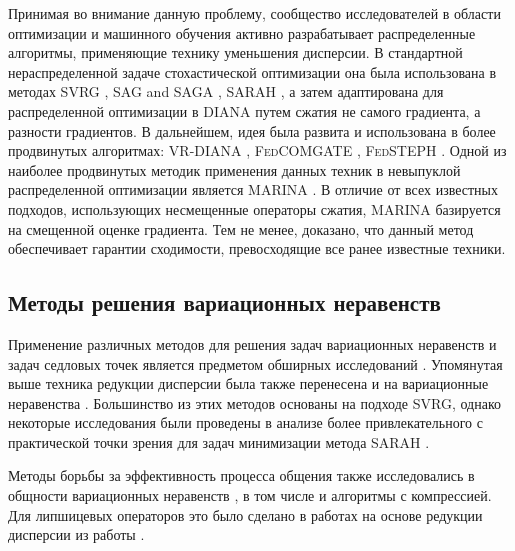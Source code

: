 \documentclass{ProcISPRAS}
\begin{document}
Принимая во внимание данную проблему, сообщество исследователей в области оптимизации и машинного обучения активно разрабатывает распределенные алгоритмы, применяющие технику уменьшения дисперсии. В стандартной нераспределенной задаче стохастической оптимизации она была использована в методах \textsc{SVRG} \cite{johnson2013accelerating}, \textsc{SAG} \cite{roux2012stochastic} and \textsc{SAGA} \cite{defazio2014saga}, \textsc{SARAH} \cite{nguyen2017sarah, beznosikov2024random}, а затем адаптирована для распределенной оптимизации в \textsc{DIANA} \cite{mishchenko2024distributed} путем сжатия не самого градиента, а разности градиентов. В дальнейшем, идея была развита и использована в более продвинутых алгоритмах: \textsc{VR-DIANA} \cite{horvoth2022natural}, \textsc{FedCOMGATE} \cite{haddadpour2021federated}, \textsc{FedSTEPH} \cite{das2022faster}.
Одной из наиболее продвинутых методик применения данных техник в невыпуклой распределенной оптимизации является \textsc{MARINA} \cite{gorbunov2021marina}. В отличие от всех известных подходов, использующих несмещенные операторы сжатия, \textsc{MARINA} базируется на смещенной оценке градиента. Тем не менее, доказано, что данный метод обеспечивает гарантии сходимости, превосходящие все ранее известные техники.

\subsection{Методы решения вариационных неравенств}
Применение различных методов для решения задач вариационных неравенств и задач седловых точек является предметом обширных исследований \cite{juditsky2011solving, gidel2018variational, hsieh2019convergence, mishchenko2020revisiting, hsieh2020explore, gorbunov2022stochastic, beznosikov2023smooth, beznosikov2024first, solodkin2024methods}. Упомянутая выше техника редукции дисперсии была также перенесена и на вариационные неравенства \cite{palaniappan2016stochastic,chavdarova2019reducing,Yura2021,alacaoglu2021stochastic, kovalev2022optimalvi, beznosikov2022unified, pichugin2023optimal, pichugin2024method, medyakovshuffling}. Большинство из этих методов основаны на подходе \textsc{SVRG}, однако некоторые исследования были проведены в анализе более привлекательного с практической точки зрения для задач минимизации метода \textsc{SARAH} \cite{chen2022faster, beznosikov2023sarah}. 

Методы борьбы за эффективность процесса общения также исследовались в общности вариационных неравенств \cite{liu2019decentralized, liu2020decentralized, tsaknakis2020decentralized, beznosikov2020distributed, deng2021local, beznosikov2021distributed, beznosikov2022decentralized}, в том числе и алгоритмы с компрессией. Для липшицевых операторов это было сделано в работах \cite{beznosikov2022distributed, beznosikov2022compression, beznosikov2024similarity} на основе редукции дисперсии из работы \cite{alacaoglu2021stochastic}. 
\end{document}
